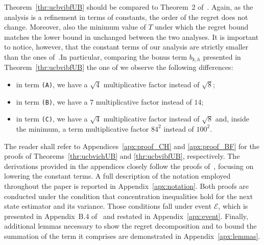 Theorem~\ref{thr:ucbvibfUB} should be compared to Theorem~2 of~\citep{azar2017minimax}. Again, as the analysis is a refinement in terms of constants, the order of the regret does not change. Moreover, also the minimum value of $T$ under which the regret bound matches the lower bound in unchanged between the two analyses. It is important to notice, however, that the constant terms of our analysis are strictly smaller than the ones of~\citep{azar2017minimax}.\footnotemark[3] In particular, comparing the bonus term $b_{k,h}$ presented in Theorem~\ref{thr:ucbvibfUB}  \wrt the one of \citep[][Algorithm~4]{azar2017minimax} we observe the following differences:
\begin{itemize}[topsep=1pt,noitemsep,leftmargin=15pt]
    \item in term \texttt{(A)}, we have a $\sqrt{4}$ multiplicative factor instead of $\sqrt{8}$;
    \item in term \texttt{(B)}, we have a $7$ multiplicative factor instead of $14$;
    \item in term \texttt{(C)}, we have a $\sqrt{4}$ multiplicative factor instead of $\sqrt{8}$ and, inside the minimum, a term multiplicative factor $84^2$ instead of $100^2$.
\end{itemize}
The reader shall refer to Appendices~\ref{apx:proof_CH} and \ref{apx:proof_BF} for the proofs of Theorems~\ref{thr:ucbvichUB} and \ref{thr:ucbvibfUB}, respectively. The derivations provided in the appendices closely follow the proofs of~\citep{azar2017minimax}, focusing on lowering the constant terms.
A full description of the notation employed throughout the paper is reported in Appendix~\ref{apx:notation}. Both proofs are conducted under the condition that concentration inequalities hold for the next state estimator and its variance. Those conditions fall under event $\mathcal{E}$, which is presented in Appendix~{B.4} of~\citep{azar2017minimax} and restated in Appendix~\ref{apx:event}. Finally, additional lemmas necessary to show the regret decomposition and to bound the summation of the term it comprises are demonstrated in Appendix~\ref{apx:lemmas}.